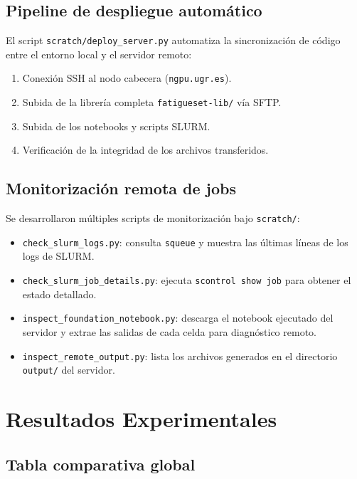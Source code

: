 \documentclass[12pt, a4paper]{article}
\newcommand{\code}[1]{\texttt{#1}}
\begin{document}
\subsection{Pipeline de despliegue automático}

El script \code{scratch/deploy\_server.py} automatiza la sincronización de código entre el entorno local y el servidor remoto:

\begin{enumerate}
    \item Conexión SSH al nodo cabecera (\code{ngpu.ugr.es}).
    \item Subida de la librería completa \code{fatigueset-lib/} vía SFTP.
    \item Subida de los notebooks y scripts SLURM.
    \item Verificación de la integridad de los archivos transferidos.
\end{enumerate}

\subsection{Monitorización remota de jobs}

Se desarrollaron múltiples scripts de monitorización bajo \code{scratch/}:
\begin{itemize}
    \item \code{check\_slurm\_logs.py}: consulta \code{squeue} y muestra las últimas líneas de los logs de SLURM.
    \item \code{check\_slurm\_job\_details.py}: ejecuta \code{scontrol show job} para obtener el estado detallado.
    \item \code{inspect\_foundation\_notebook.py}: descarga el notebook ejecutado del servidor y extrae las salidas de cada celda para diagnóstico remoto.
    \item \code{inspect\_remote\_output.py}: lista los archivos generados en el directorio \code{output/} del servidor.
\end{itemize}


\section{Resultados Experimentales}
\label{sec:resultados}


\subsection{Tabla comparativa global}
\end{document}
